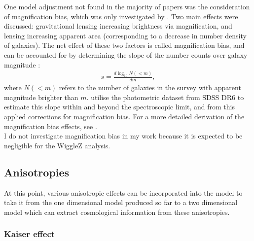 \documentclass[titlesmallcaps, examinerscopy, copyrightpage]{uqthesis}
\begin{document}
One model adjustment not found in the majority of papers was the consideration of magnification bias, which was only investigated by  \citet{Gaztanaga2009}. Two main effects were discussed: gravitational lensing increasing brightness via magnification, and lensing increasing apparent area (corresponding to a decrease in number density of galaxies). The net effect of these two factors is called magnification bias, and can be accounted for by determining the slope of the number counts over galaxy magnitude \citep{TurnerOstriker1984,  WebsterHewett1988, Fugmann1988, Narayan1989, Schneider1989, BroadhurstTaylor1995, MoessnerJain1998}:
\begin{align}
s = \frac{d \log_{10} N(<m)}{dm},
\end{align}
where $N(<m)$ refers to the number of galaxies in the survey with apparent magnitude brighter than $m$. \citet{Gaztanaga2009} utilise the photometric dataset from SDSS DR6 \citep[DR6:][]{Adelman2008} to estimate this slope within and beyond the spectroscopic limit, and from this applied corrections for magnification bias. For a more detailed derivation of the magnification bias effects, see \citet[\S 2.2]{Gaztanaga2009}.\\

I do not investigate magnification bias in my work because it is expected to be negligible for the WiggleZ analysis.


\subsection{Anisotropies}

At this point, various anisotropic effects can be incorporated into the model to take it from the one dimensional model produced so far to a two dimensional model which can extract cosmological information from these anisotropies.

\subsubsection{Kaiser effect}
\end{document}
